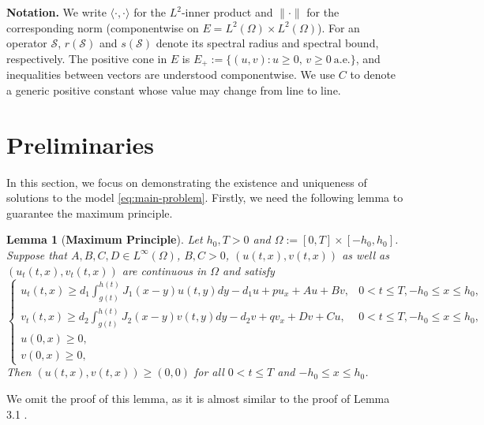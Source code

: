 \documentclass[a4paper,11pt]{amsart}
\newtheorem{lemma}[theorem]{Lemma}
\theoremstyle{definition}
\numberwithin{equation}{section}
\theoremstyle{definition}
\begin{document}
\medskip
\noindent\textbf{Notation.}
We write $\langle\cdot,\cdot\rangle$ for the $L^2$-inner product and $\|\cdot\|$ for the corresponding norm (componentwise on $E=L^2(\Omega)\times L^2(\Omega)$). For an operator $\mathcal{S}$, $r(\mathcal{S})$ and $s(\mathcal{S})$ denote its spectral radius and spectral bound, respectively. The positive cone in $E$ is $E_+:=\{(u,v):u\ge 0,\,v\ge 0\ \text{a.e.}\}$, and inequalities between vectors are understood componentwise. We use $C$ to denote a generic positive constant whose value may change from line to line.




\section{Preliminaries}

 In this section, we focus on demonstrating the existence and uniqueness of solutions to the model \eqref{eq:main-problem}. Firstly, we need the following lemma to guarantee the maximum principle.



\begin{lemma}[\textbf{Maximum Principle}] \label{MaximumLemma}
Let $h_0, T > 0$ and $\Omega := [0,T] \times [-h_0, h_0]$. Suppose that $A, B, C, D \in L^\infty(\Omega)$, $B, C > 0$, $(u(t,x), v(t,x))$ as well as $(u_t(t,x), v_t(t,x))$ are continuous in $\Omega$ and satisfy
\begin{equation*}
\left\{
\begin{array}{ll}
u_t(t,x) \geq d_1 \int_{g(t)}^{h(t)} J_1(x-y)u(t,y)dy - d_1 u +pu_x+ Au + Bv, & 0 < t \leq T, -h_0 \leq x \leq h_0, \\
v_t(t,x) \geq d_2 \int_{g(t)}^{h(t)} J_2(x-y)v(t,y)dy - d_2 v +qv_x+ Dv + Cu, & 0 < t \leq T, -h_0 \leq x \leq h_0, \\
u(0,x) \geq 0, & \\
v(0,x) \geq 0, &
\end{array}
\right.
\end{equation*}
Then $(u(t,x),v(t,x)) \geq (0,0)$ for all $0 < t \leq T$ and $-h_0 \le x \le h_0$.
\end{lemma}
We omit the proof of this lemma, as it is almost similar to the proof of Lemma 3.1 \cite{DuNi2020}.
\end{document}
